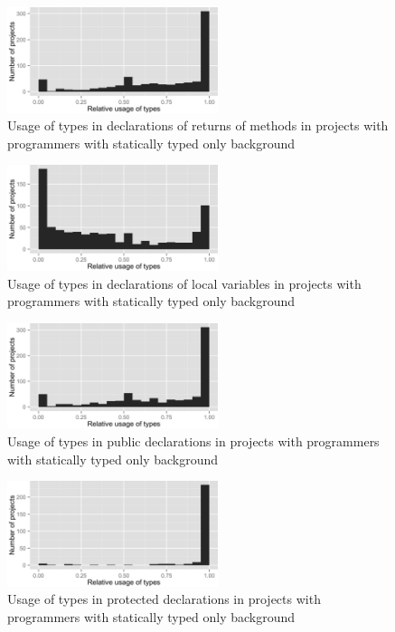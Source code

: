 \begin{figure}[h]
\centering 
\includegraphics[width=0.55\textwidth]{../aosd_2014/analysis/result/background/static-only/histograms/7_Method_Return.png} 
\caption{Usage of types in declarations of returns of methods in projects with programmers with statically typed only background}
\end{figure}

\begin{figure}[h]
\centering 
\includegraphics[width=0.55\textwidth]{../aosd_2014/analysis/result/background/static-only/histograms/6_Local_Variable.png} 
\caption{Usage of types in declarations of local variables in projects with programmers with statically typed only background}
\end{figure}

\begin{figure}[h]
\centering 
\includegraphics[width=0.55\textwidth]{../aosd_2014/analysis/result/background/static-only/histograms/13_Public.png} 
\caption{Usage of types in public declarations in projects with programmers with statically typed only background}
\end{figure}

\begin{figure}[h]
\centering 
\includegraphics[width=0.55\textwidth]{../aosd_2014/analysis/result/background/static-only/histograms/12_Protected.png} 
\caption{Usage of types in protected declarations in projects with programmers with statically typed only background}
\end{figure}

